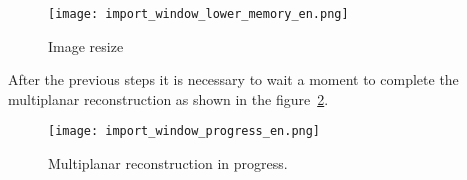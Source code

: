 \begin{figure}[!htb]
\centering
\texttt{[image: import\_window\_lower\_memory\_en.png]}
\caption{Image resize}
\label{fig:import_bmp_resize_pt}
\end{figure}


After the previous steps it is necessary to wait a moment to complete the multiplanar reconstruction as shown in the figure~\ref{fig:import_bmp_mpr_pt.png}.

\begin{figure}[!htb]
\centering
\texttt{[image: import\_window\_progress\_en.png]}
\caption{Multiplanar reconstruction in progress.}
\label{fig:import_bmp_mpr_pt.png}
\end{figure}
